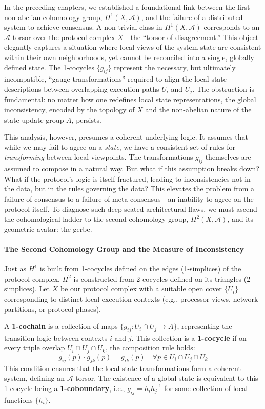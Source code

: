 \documentclass[
]{article}
\begin{document}
In the preceding chapters, we established a foundational link between
the first non-abelian cohomology group, \(H^1(X, \mathcal{A})\), and the
failure of a distributed system to achieve consensus. A non-trivial
class in \(H^1(X, \mathcal{A})\) corresponds to an
\(\mathcal{A}\)-torsor over the protocol complex \(X\)---the ``torsor of
disagreement.'' This object elegantly captures a situation where local
views of the system state are consistent within their own neighborhoods,
yet cannot be reconciled into a single, globally defined state. The
1-cocycles \(\{g_{ij}\}\) represent the necessary, but ultimately
incompatible, ``gauge transformations'' required to align the local
state descriptions between overlapping execution paths \(U_i\) and
\(U_j\). The obstruction is fundamental: no matter how one redefines
local state representations, the global inconsistency, encoded by the
topology of \(X\) and the non-abelian nature of the state-update group
\(A\), persists.

This analysis, however, presumes a coherent underlying logic. It assumes
that while we may fail to agree on a \emph{state}, we have a consistent
set of rules for \emph{transforming} between local viewpoints. The
transformations \(g_{ij}\) themselves are assumed to compose in a
natural way. But what if this assumption breaks down? What if the
protocol's logic is itself fractured, leading to inconsistencies not in
the data, but in the rules governing the data? This elevates the problem
from a failure of consensus to a failure of meta-consensus---an
inability to agree on the protocol itself. To diagnose such deep-seated
architectural flaws, we must ascend the cohomological ladder to the
second cohomology group, \(H^2(X, \mathcal{A})\), and its geometric
avatar: the gerbe.

\paragraph{The Second Cohomology Group and the Measure of
Inconsistency}\label{the-second-cohomology-group-and-the-measure-of-inconsistency}

Just as \(H^1\) is built from 1-cocycles defined on the edges
(1-simplices) of the protocol complex, \(H^2\) is constructed from
2-cocycles defined on its triangles (2-simplices). Let \(X\) be our
protocol complex with a suitable open cover \(\{U_i\}\) corresponding to
distinct local execution contexts (e.g., processor views, network
partitions, or protocol phases).

A \textbf{1-cochain} is a collection of maps
\(\{g_{ij}: U_i \cap U_j \to A\}\), representing the transition logic
between contexts \(i\) and \(j\). This collection is a
\textbf{1-cocycle} if on every triple overlap \(U_i \cap U_j \cap U_k\),
the composition rule holds:
\[g_{ij}(p) \cdot g_{jk}(p) = g_{ik}(p) \quad \forall p \in U_i \cap U_j \cap U_k\]
This condition ensures that the local state transformations form a
coherent system, defining an \(\mathcal{A}\)-torsor. The existence of a
global state is equivalent to this 1-cocycle being a
\textbf{1-coboundary}, i.e., \(g_{ij} = h_i h_j^{-1}\) for some
collection of local functions \(\{h_i\}\).
\end{document}

